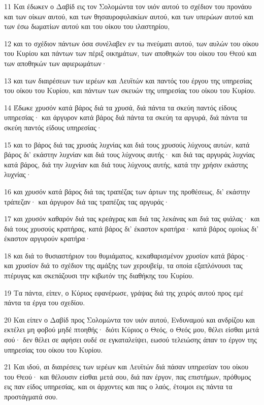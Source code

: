 \par 11 Και έδωκεν ο Δαβίδ εις τον Σολομώντα τον υιόν αυτού το σχέδιον του προνάου και των οίκων αυτού, και των θησαυροφυλακίων αυτού, και των υπερώων αυτού και των έσω δωματίων αυτού και του οίκου του ιλαστηρίου,
\par 12 και το σχέδιον πάντων όσα συνέλαβεν εν τω πνεύματι αυτού, των αυλών του οίκου του Κυρίου και πάντων των πέριξ οικημάτων, των αποθηκών του οίκου του Θεού και των αποθηκών των αφιερωμάτων·
\par 13 και των διαιρέσεων των ιερέων και Λευϊτών και παντός του έργου της υπηρεσίας του οίκου του Κυρίου, και πάντων των σκευών της υπηρεσίας του οίκου του Κυρίου.
\par 14 Έδωκε χρυσόν κατά βάρος διά τα χρυσά, διά πάντα τα σκεύη παντός είδους υπηρεσίας· και άργυρον κατά βάρος διά πάντα τα σκεύη τα αργυρά, διά πάντα τα σκεύη παντός είδους υπηρεσίας·
\par 15 και το βάρος διά τας χρυσάς λυχνίας και διά τους χρυσούς λύχνους αυτών, κατά βάρος δι' εκάστην λυχνίαν και διά τους λύχνους αυτής· και διά τας αργυράς λυχνίας κατά βάρος, διά την λυχνίαν και διά τους λύχνους αυτής, κατά την χρήσιν εκάστης λυχνίας·
\par 16 και χρυσόν κατά βάρος διά τας τραπέζας των άρτων της προθέσεως, δι' εκάστην τράπεζαν· και άργυρον διά τας τραπέζας τας αργυράς·
\par 17 και χρυσόν καθαρόν διά τας κρεάγρας και διά τας λεκάνας και διά τας φιάλας· και διά τους χρυσούς κρατήρας, κατά βάρος δι' έκαστον κρατήρα· κατά βάρος ομοίως δι' έκαστον αργυρούν κρατήρα·
\par 18 και διά το θυσιαστήριον του θυμιάματος, κεκαθαρισμένον χρυσίον κατά βάρος· και χρυσίον διά το σχέδιον της αμάξης των χερουβείμ, τα οποία εξαπλόνουσι τας πτέρυγας και σκεπάζουσι την κιβωτόν της διαθήκης του Κυρίου.
\par 19 Τα πάντα, είπεν, ο Κύριος εφανέρωσε, γράψας διά της χειρός αυτού προς εμέ πάντα τα έργα του σχεδίου.
\par 20 Και είπεν ο Δαβίδ προς Σολομώντα τον υιόν αυτού, Ενδυναμού και ανδρίζου και εκτέλει μη φοβού μηδέ πτοηθής· διότι Κύριος ο Θεός, ο Θεός μου, θέλει είσθαι μετά σού· δεν θέλει σε αφήσει ουδέ σε εγκαταλείψει, εωσού τελειώσης άπαν το έργον της υπηρεσίας του οίκου του Κυρίου.
\par 21 Και ιδού, αι διαιρέσεις των ιερέων και Λευϊτών διά πάσαν υπηρεσίαν του οίκου του Θεού· και θέλουσιν είσθαι μετά σου, διά παν έργον, πας επιστήμων, πρόθυμος εις παν είδος υπηρεσίας, και οι άρχοντες και πας ο λαός, έτοιμοι εις πάντα τα προστάγματά σου.

